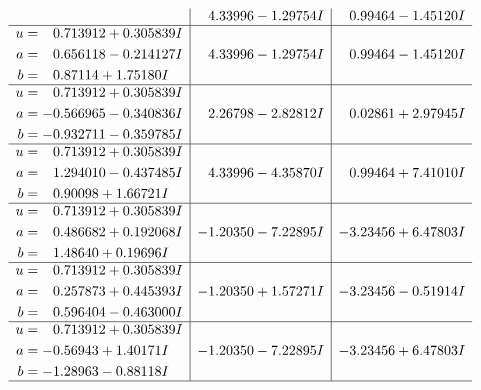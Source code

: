 \documentclass[1p]{elsarticle_modified}
\theoremstyle{definition}
\begin{document}
$$\begin{array}{c|c|c}
 & \phantom{-}4.33996 - 1.29754 I & \phantom{-}0.99464 - 1.45120 I \\ \hline\begin{aligned}
u &= \phantom{-}0.713912 + 0.305839 I \\
a &= \phantom{-}0.656118 - 0.214127 I \\
b &= \phantom{-}0.87114 + 1.75180 I\end{aligned}
 & \phantom{-}4.33996 - 1.29754 I & \phantom{-}0.99464 - 1.45120 I \\ \hline\begin{aligned}
u &= \phantom{-}0.713912 + 0.305839 I \\
a &= -0.566965 - 0.340836 I \\
b &= -0.932711 - 0.359785 I\end{aligned}
 & \phantom{-}2.26798 - 2.82812 I & \phantom{-}0.02861 + 2.97945 I \\ \hline\begin{aligned}
u &= \phantom{-}0.713912 + 0.305839 I \\
a &= \phantom{-}1.294010 - 0.437485 I \\
b &= \phantom{-}0.90098 + 1.66721 I\end{aligned}
 & \phantom{-}4.33996 - 4.35870 I & \phantom{-}0.99464 + 7.41010 I \\ \hline\begin{aligned}
u &= \phantom{-}0.713912 + 0.305839 I \\
a &= \phantom{-}0.486682 + 0.192068 I \\
b &= \phantom{-}1.48640 + 0.19696 I\end{aligned}
 & -1.20350 - 7.22895 I & -3.23456 + 6.47803 I \\ \hline\begin{aligned}
u &= \phantom{-}0.713912 + 0.305839 I \\
a &= \phantom{-}0.257873 + 0.445393 I \\
b &= \phantom{-}0.596404 - 0.463000 I\end{aligned}
 & -1.20350 + 1.57271 I & -3.23456 - 0.51914 I \\ \hline\begin{aligned}
u &= \phantom{-}0.713912 + 0.305839 I \\
a &= -0.56943 + 1.40171 I \\
b &= -1.28963 - 0.88118 I\end{aligned}
 & -1.20350 - 7.22895 I & -3.23456 + 6.47803 I\\
 \hline 
 \end{array}$$\newpage$$\begin{array}{c|c|c}  

\end{array}$$
\end{document}
